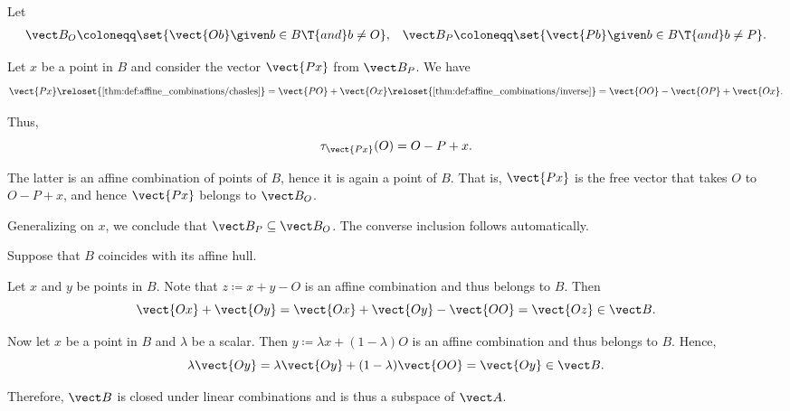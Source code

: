 \begin{defproof}
   Let
  \begin{align*}
    \vect B_O \coloneqq \set{ \vect{Ob} \given b \in B \T{and} b \neq O },
    &&
    \vect B_P \coloneqq \set{ \vect{Pb} \given b \in B \T{and} b \neq P }.
  \end{align*}

  Let \( x \) be a point in \( B \) and consider the vector \( \vect{P x} \) from \( \vect B_P \). We have
  \begin{equation*}
    \vect{P x}
    \reloset {\ref{thm:def:affine_combinations/chasles}} =
    \vect{PO} + \vect{O x}
    \reloset {\ref{thm:def:affine_combinations/inverse}} =
    \vect{OO} - \vect{OP} + \vect{O x}.
  \end{equation*}

  Thus,
  \begin{equation*}
    \tau_{\vect{Px}}(O) = O - P + x.
  \end{equation*}

  The latter is an affine combination of points of \( B \), hence it is again a point of \( B \). That is, \( \vect{Px} \) is the free vector that takes \( O \) to \( O - P + x \), and hence \( \vect{Px} \) belongs to \( \vect B_O \).

  Generalizing on \( x \), we conclude that \( \vect B_P \subseteq \vect B_O \). The converse inclusion follows automatically.

   Suppose that \( B \) coincides with its affine hull.

  Let \( x \) and \( y \) be points in \( B \). Note that \( z \coloneqq x + y - O \) is an affine combination and thus belongs to \( B \). Then
  \begin{equation*}
    \vect{Ox} + \vect{Oy}
    =
    \vect{Ox} + \vect{Oy} - \vect{OO}
    =
    \vect{Oz}
    \in
    \vect B.
  \end{equation*}

  Now let \( x \) be a point in \( B \) and \( \lambda \) be a scalar. Then \( y \coloneqq \lambda x + (1 - \lambda) O \) is an affine combination and thus belongs to \( B \). Hence,
  \begin{equation*}
    \lambda \vect{Oy}
    =
    \lambda \vect{Oy} + (1 - \lambda) \vect{OO}
    =
    \vect{Oy}
    \in
    \vect B.
  \end{equation*}

  Therefore, \( \vect B \) is closed under linear combinations and is thus a subspace of \( \vect A \).


\end{defproof}
